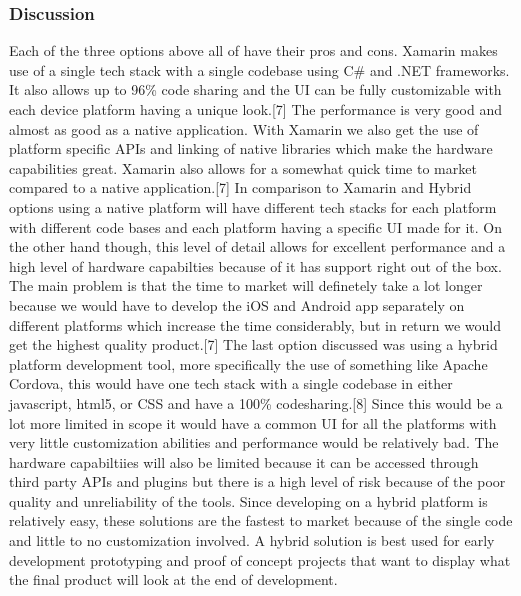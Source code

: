 \documentclass[onecolumn, draftclsnofoot,10pt, compsoc]{IEEEtran}
\begin{document}
\subsubsection{Discussion}
Each of the three options above all of have their pros and cons. Xamarin makes use of a single tech stack with a single codebase using C\# and .NET frameworks. It also allows up to 96\% code sharing and the UI can be fully customizable with each device platform having a unique look.[7] The performance is very good and almost as good as a native application. With Xamarin we also get the use of platform specific APIs and linking of native libraries which make the hardware capabilities great. Xamarin also allows for a somewhat quick time to market compared to a native application.[7] In comparison to Xamarin and Hybrid options using a native platform will have different tech stacks for each platform with different code bases and each platform having a specific UI made for it. On the other hand though, this level of detail allows for excellent performance and a high level of hardware capabilties because of it has support right out of the box. The main problem is that the time to market will definetely take a lot longer because we would have to develop the iOS and Android app separately on different platforms which increase the time considerably, but in return we would get the highest quality product.[7] The last option discussed was using a hybrid platform development tool, more specifically the use of something like Apache Cordova, this would have one tech stack with a single codebase in either javascript, html5, or CSS and have a 100\% codesharing.[8] Since this would be a lot more limited in scope it would have a common UI for all the platforms with very little customization abilities and performance would be relatively bad. The hardware capabiltiies will also be limited because it can be accessed through third party APIs and plugins but there is a high level of risk because of the poor quality and unreliability of the tools. Since developing on a hybrid platform is relatively easy, these solutions are the fastest to market because of the single code and little to no customization involved. A hybrid solution is best used for early development prototyping and proof of concept projects that want to display what the final product will look at the end of development.
\end{document}
